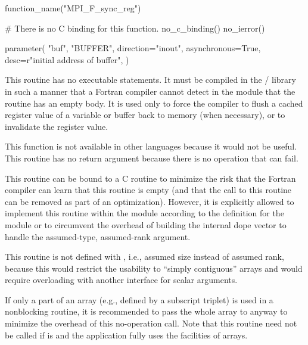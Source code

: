 \begin{mpi-binding}
    function_name("MPI_F_sync_reg")

    # There is no C binding for this function.
    no_c_binding()
    no_ierror()

    parameter(
        "buf",
        "BUFFER",
        direction="inout",
        asynchronous=True,
        desc=r"initial address of buffer",
    )
\end{mpi-binding}

This routine has no executable statements. It must be compiled in the \MPI/ library
in such a manner that a Fortran compiler cannot detect in the module that the routine
has an empty body.
It is used only to force the compiler to flush a cached register value of a variable or buffer
back to memory (when necessary), or to invalidate the register value.

\begin{rationale}
This function is not available in other languages
because it would not be useful.
This routine has no  return argument because
there is no operation that can fail.
\end{rationale}

\begin{implementors}
This routine can be bound to a C routine to minimize
the risk that the Fortran compiler can learn that this routine is empty
(and that the call to this routine can be removed
as part of an optimization).
However, it is explicitly allowed to implement this routine within the
 module according to the definition
for the  module or  to circumvent
the overhead of building the internal dope vector to handle
the assumed-type, assumed-rank argument.
\end{implementors}

\begin{rationale}
This routine is not defined with ,
i.e., assumed size instead of assumed rank, because this
would restrict the usability to ``simply contiguous'' arrays
and would require overloading with another interface for
scalar arguments.
\end{rationale}

\begin{users}
If only a part of an array (e.g., defined by a subscript triplet)
is used in a nonblocking routine,
it is recommended to pass the whole array to 
anyway to minimize the overhead of this no-operation call.
Note that this routine need not be called
if  is  and
the application fully uses the facilities of  arrays.
\end{users}

